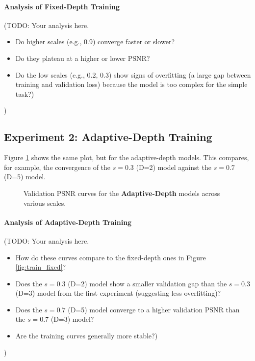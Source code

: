 \paragraph{Analysis of Fixed-Depth Training}
(TODO: Your analysis here.
\begin{itemize}
    \item Do higher scales (e.g., 0.9) converge faster or slower?
    \item Do they plateau at a higher or lower PSNR?
    \item Do the low scales (e.g., 0.2, 0.3) show signs of overfitting (a large gap between training and validation loss) because the model is too complex for the simple task?)
\end{itemize}
)

\subsection{Experiment 2: Adaptive-Depth Training}
Figure \ref{fig:train_adaptive} shows the same plot, but for the adaptive-depth models. This compares, for example, the convergence of the $s=0.3$ (D=2) model against the $s=0.7$ (D=5) model.

\begin{figure}[h!]
    \centering
    
    \caption{Validation PSNR curves for the \textbf{Adaptive-Depth} models across various scales.}
    \label{fig:train_adaptive}
\end{figure}

\paragraph{Analysis of Adaptive-Depth Training}
(TODO: Your analysis here.
\begin{itemize}
    \item How do these curves compare to the fixed-depth ones in Figure \ref{fig:train_fixed}?
    \item Does the $s=0.3$ (D=2) model show a smaller validation gap than the $s=0.3$ (D=3) model from the first experiment (suggesting less overfitting)?
    \item Does the $s=0.7$ (D=5) model converge to a higher validation PSNR than the $s=0.7$ (D=3) model?
    \item Are the training curves generally more stable?)
\end{itemize}
)
